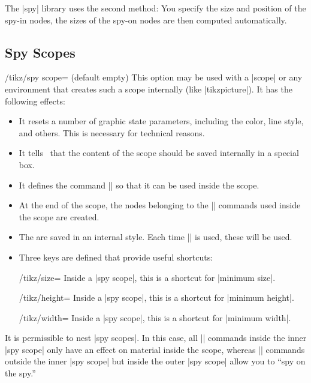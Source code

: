 The |spy| library uses the second method: You specify the size and
position of the spy-in nodes, the sizes of the spy-on nodes are then
computed automatically.



\subsection{Spy Scopes}

\begin{key}{/tikz/spy scope= (default \normalfont empty)}
  This option may be used with a |{scope}| or any environment that
  creates such a scope internally (like |{tikzpicture}|). It has the
  following effects:
  \begin{itemize}
  \item It resets a number of graphic state parameters, including the
    color, line style, and others. This is necessary for technical
    reasons.
  \item It tells \tikzname\ that the content of the scope should be saved
    internally in a special box.
  \item It defines the command |\spy| so that it can be used inside
    the scope.
  \item At the end of the scope, the nodes belonging to the |\spy|
    commands used inside the scope are created.
  \item The  are saved in an internal style. Each time
    |\spy| is used, these  will be used.
  \item Three keys are defined that provide useful shortcuts:
    \begin{key}{/tikz/size=}
      Inside a |spy scope|, this is a shortcut for |minimum size|.
    \end{key}
    \begin{key}{/tikz/height=}
      Inside a |spy scope|, this is a shortcut for |minimum height|.
    \end{key}
    \begin{key}{/tikz/width=}
      Inside a |spy scope|, this is a shortcut for |minimum width|.
    \end{key}
  \end{itemize}
  It is permissible to nest |spy scopes|. In this case, all |\spy|
  commands inside the inner |spy scope| only have an effect on
  material inside the scope, whereas |\spy| commands outside the inner
  |spy scope| but inside the outer |spy scope| allow you to ``spy on
  the spy.''


\end{key}
